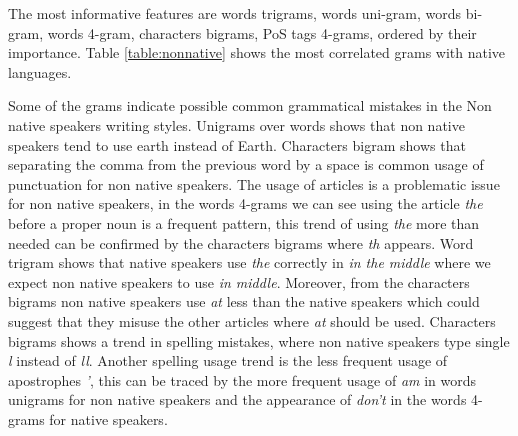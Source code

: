 \documentclass[11pt]{article}
\begin{document}
The most informative features are words trigrams, words uni-gram, words bi-gram, words 4-gram, characters bigrams, PoS tags 4-grams, ordered by their importance. Table \ref{table:nonnative} shows the most correlated grams with native languages.

Some of the grams indicate possible common grammatical mistakes in the Non native speakers writing styles. Unigrams over words shows that non native speakers tend to use earth instead of Earth. Characters bigram shows that separating the comma from the previous word by a space is common usage of punctuation for non native speakers.
The usage of articles is a problematic issue for non native speakers, in the words 4-grams we can see using the article \emph{the} before a proper noun is a frequent pattern, this trend of using \emph{the} more than needed can be confirmed by the characters bigrams where \emph{th} appears. Word trigram shows that native speakers use \emph{the} correctly in \emph{in the middle} where we expect non native speakers to use \emph{in middle}.
Moreover, from the characters bigrams non native speakers use \emph{at} less than the native speakers which could suggest that they misuse the other articles where \emph{at} should be used. Characters bigrams shows a trend in spelling mistakes, where non native speakers type single \emph{l} instead of \emph{ll}. Another spelling usage trend is the less frequent usage of apostrophes \emph{'}, this can be traced by the more frequent usage of \emph{am} in words unigrams for non native speakers and the appearance of \emph{don't} in the words 4-grams for native speakers.
\end{document}
